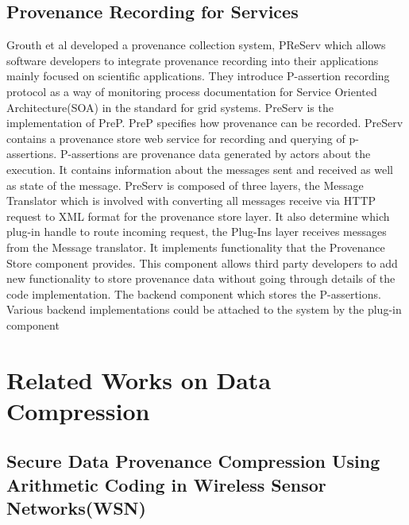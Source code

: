 \subsection{Provenance Recording for Services}
Grouth et al developed a provenance collection system, PReServ which allows software developers to integrate provenance recording into their applications mainly focused on scientific applications. They introduce P-assertion recording protocol as a way of monitoring process  documentation for Service Oriented Architecture(SOA) in the standard for grid systems. PreServ is the implementation of PreP. PreP specifies how provenance can be recorded.  PreServ contains a provenance store web service for recording and querying of p-assertions. P-assertions are provenance data generated by actors about the execution. It contains information about the messages sent and received as well as state of the message. PreServ is composed of three layers, the Message Translator which is involved with converting all messages receive via HTTP request to XML format for the provenance store layer. It also determine which plug-in handle to route incoming request, the  Plug-Ins layer receives messages from the Message translator. It implements functionality that the Provenance Store component provides. This component allows third party developers to add new functionality to store provenance data without going through details of the code implementation. The backend component which stores the P-assertions. Various backend implementations could be attached to the system by the plug-in component



\section{Related Works on Data Compression}

\subsection{Secure Data Provenance Compression Using Arithmetic Coding in Wireless Sensor Networks(WSN)}

